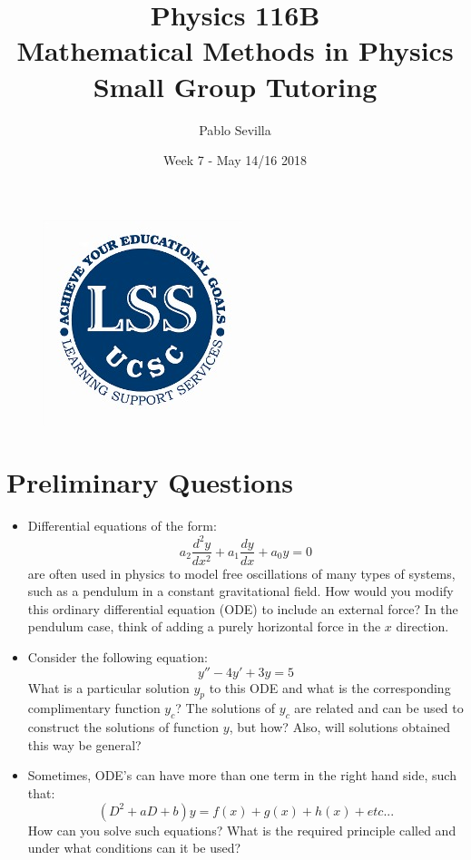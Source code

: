 \documentclass{article}
\title{Physics 116B \\ Mathematical Methods in Physics\\ Small Group Tutoring}
\author{Pablo Sevilla}
\date{Week 7 - May 14/16 2018}
\begin{document}
\maketitle

\begin{figure}[h]
\centering
\includegraphics[scale=0.3]{lss}
\end{figure}
\section{Preliminary Questions}
 \begin{itemize}
  \item Differential equations of the form:
  \begin{equation}
      a_2\frac{d^2y}{dx^2}+a_1\frac{dy}{dx}+a_0y=0
  \end{equation} 
  are often used in physics to model free oscillations of many types of systems, such as a pendulum in a constant gravitational field. How would you modify this ordinary differential equation (ODE) to include an external force? In the pendulum case, think of adding a purely horizontal force in the $x$ direction.
  \item Consider the following equation:
  \begin{equation}
      y''-4y'+3y=5
  \end{equation} 
  What is a particular solution $y_p$ to this ODE and what is the corresponding complimentary function $y_c$? The solutions of $y_c$ are related and can be used to construct the solutions of function $y$, but how? Also, will solutions obtained this way be general?
  \item Sometimes, ODE's can have more than one term in the right hand side, such that:
  \begin{equation}
      (D^2+aD+b)y=f(x)+g(x)+h(x)+etc...
  \end{equation} 
  How can you solve such equations? What is the required principle called and under what conditions can it be used?
 \end{itemize}
  
\end{document}
